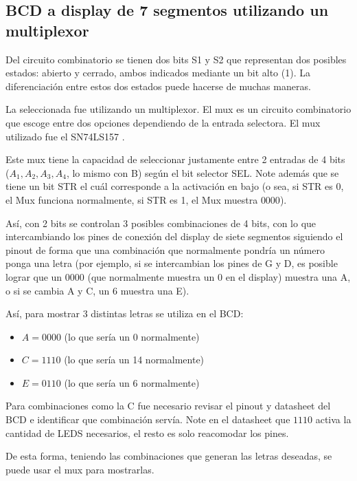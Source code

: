 \documentclass[conference]{IEEEtran}  %
\begin{document}
\subsection{BCD a display de 7 segmentos utilizando un multiplexor}

Del circuito combinatorio se tienen dos bits S1 y S2 que representan dos posibles estados: abierto y cerrado, ambos indicados mediante un bit alto (1). La diferenciación entre estos dos estados puede hacerse de muchas maneras.

La seleccionada fue utilizando un multiplexor. El mux es un circuito combinatorio que escoge entre dos opciones dependiendo de la entrada selectora. El mux utilizado fue el SN74LS157 \cite{Sandorobotics_74LS157}.

Este mux tiene la capacidad de seleccionar justamente entre 2 entradas de 4 bits ($A_1,A_2,A_3,A_4$, lo mismo con B) según el bit selector SEL. Note además que se tiene un bit STR el cuál corresponde a la activación en bajo (o sea, si STR es 0, el Mux funciona normalmente, si STR es 1, el Mux muestra $0000$).

Así, con 2 bits se controlan 3 posibles combinaciones de 4 bits, con lo que intercambiando los pines de conexión del display de siete segmentos \cite{XLITX_5621BS} siguiendo el pinout de forma que una combinación que normalmente pondría un número ponga una letra (por ejemplo, si se intercambian los pines de G y D, es posible lograr que un 0000 (que normalmente muestra un 0 en el display) muestra una A, o si se cambia A y C, un 6 muestra una E).

Así, para mostrar 3 distintas letras se utiliza en el BCD:

\begin{itemize}
    \item $ A = 0000 $ (lo que sería un 0 normalmente)
    \item $ C = 1110 $ (lo que sería un 14 normalmente)
    \item $ E = 0110 $ (lo que sería un 6 normalmente)
\end{itemize}

Para combinaciones como la C fue necesario revisar el pinout y datasheet del BCD e identificar que combinación servía. Note en el datasheet \cite{TI_SN74LS47} que $1110$ activa la cantidad de LEDS necesarios, el resto es solo reacomodar los pines. 

De esta forma, teniendo las combinaciones que generan las letras deseadas, se puede usar el mux para mostrarlas.
\end{document}
